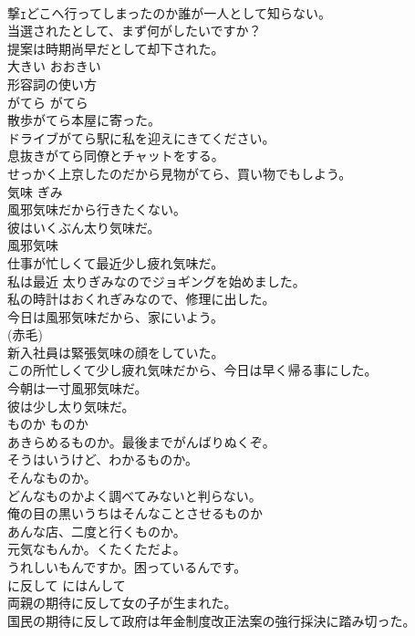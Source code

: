 \documentclass[8pt]{extreport}
\begin{document}
\begin{CJK}{UTF8}{min}
\\	撃ｪどこへ行ってしまったのか誰が一人として知らない。   
\\	当選されたとして、まず何がしたいですか？   
\\	提案は時期尚早だとして却下された。   
\\	大きい	おおきい	
\\	形容詞の使い方	
\\	がてら	がてら	
\\	散歩がてら本屋に寄った。  
\\	ドライブがてら駅に私を迎えにきてください。  
\\	息抜きがてら同僚とチャットをする。  
\\	せっかく上京したのだから見物がてら、買い物でもしよう。  
\\	気味	ぎみ	
\\	風邪気味だから行きたくない。  
\\	彼はいくぶん太り気味だ。  
\\	風邪気味 
\\	仕事が忙しくて最近少し疲れ気味だ。  
\\	私は最近 太りぎみなのでジョギングを始めました。  
\\	私の時計はおくれぎみなので、修理に出した。  
\\	今日は風邪気味だから、家にいよう。  
\\	(赤毛)
\\	新入社員は緊張気味の顔をしていた。  
\\	この所忙しくて少し疲れ気味だから、今日は早く帰る事にした。   
\\	今朝は一寸風邪気味だ。  
\\	彼は少し太り気味だ。   
\\	ものか	ものか	
\\	あきらめるものか。最後までがんばりぬくぞ。  
\\	そうはいうけど、わかるものか。  
\\	そんなものか。  
\\	どんなものかよく調べてみないと判らない。  
\\	俺の目の黒いうちはそんなことさせるものか  
\\	あんな店、二度と行くものか。   
\\	元気なもんか。くたくただよ。   
\\	うれしいもんですか。困っているんです。  
\\	に反して	にはんして	
\\	両親の期待に反して女の子が生まれた。  
\\	国民の期待に反して政府は年金制度改正法案の強行採決に踏み切った。  

\end{CJK}
\end{document}
